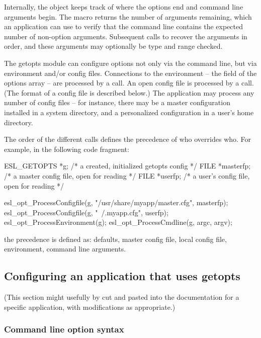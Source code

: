 Internally, the object keeps track of where the options end and
command line arguments begin. The macro 
returns the number of arguments remaining, which an application can
use to verify that the command line contains the expected number of
non-option arguments.  Subsequent calls to
 recover the arguments in order, and
these arguments may optionally be type and range checked.

The getopts module can configure options not only via the command
line, but via environment and/or config files.  Connections to the
environment -- the  field of the options array -- are
processed by a  call.  An open
config file is processed by a 
call. (The format of a config file is described below.) The
application may process any number of config files -- for instance,
there may be a master configuration installed in a system directory,
and a personalized configuration in a user's home directory.

The order of the different  calls defines the
precedence of who overrides who. For example, in the following code
fragment:

\begin{cchunk}
   ESL_GETOPTS *g;        /* a created, initialized getopts config  */
   FILE *masterfp;        /* a master config file, open for reading */
   FILE *userfp;          /* a user's config file, open for reading */

   esl_opt_ProcessConfigfile(g, "/usr/share/myapp/master.cfg", masterfp);
   esl_opt_ProcessConfigfile(g, "~/.myapp.cfg",                userfp);
   esl_opt_ProcessEnvironment(g);
   esl_opt_ProcessCmdline(g, argc, argv);
\end{cchunk}

the precedence is defined as: defaults, master config file, local
config file, environment, command line arguments. 


\subsection{Configuring an application that uses getopts}

(This section might usefully by cut and pasted into the documentation
for a specific application, with modifications as appropriate.)

   \subsubsection{Command line option syntax}

